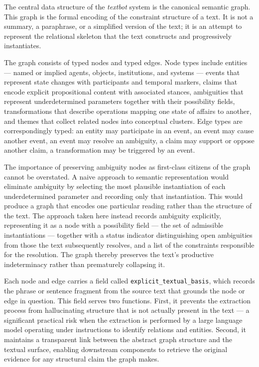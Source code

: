 \documentclass[12pt, a4paper]{article}
\begin{document}
The central data structure of the \textit{textbot} system is the canonical semantic graph. This graph is the formal encoding of the constraint structure of a text. It is not a summary, a paraphrase, or a simplified version of the text; it is an attempt to represent the relational skeleton that the text constructs and progressively instantiates.

The graph consists of typed nodes and typed edges. Node types include entities — named or implied agents, objects, institutions, and systems — events that represent state changes with participants and temporal markers, claims that encode explicit propositional content with associated stances, ambiguities that represent underdetermined parameters together with their possibility fields, transformations that describe operations mapping one state of affairs to another, and themes that collect related nodes into conceptual clusters. Edge types are correspondingly typed: an entity may participate in an event, an event may cause another event, an event may resolve an ambiguity, a claim may support or oppose another claim, a transformation may be triggered by an event.

The importance of preserving ambiguity nodes as first-class citizens of the graph cannot be overstated. A naive approach to semantic representation would eliminate ambiguity by selecting the most plausible instantiation of each underdetermined parameter and recording only that instantiation. This would produce a graph that encodes one particular reading rather than the structure of the text. The approach taken here instead records ambiguity explicitly, representing it as a node with a possibility field — the set of admissible instantiations — together with a status indicator distinguishing open ambiguities from those the text subsequently resolves, and a list of the constraints responsible for the resolution. The graph thereby preserves the text's productive indeterminacy rather than prematurely collapsing it.

Each node and edge carries a field called \texttt{explicit\_textual\_basis}, which records the phrase or sentence fragment from the source text that grounds the node or edge in question. This field serves two functions. First, it prevents the extraction process from hallucinating structure that is not actually present in the text — a significant practical risk when the extraction is performed by a large language model operating under instructions to identify relations and entities. Second, it maintains a transparent link between the abstract graph structure and the textual surface, enabling downstream components to retrieve the original evidence for any structural claim the graph makes.
\end{document}
